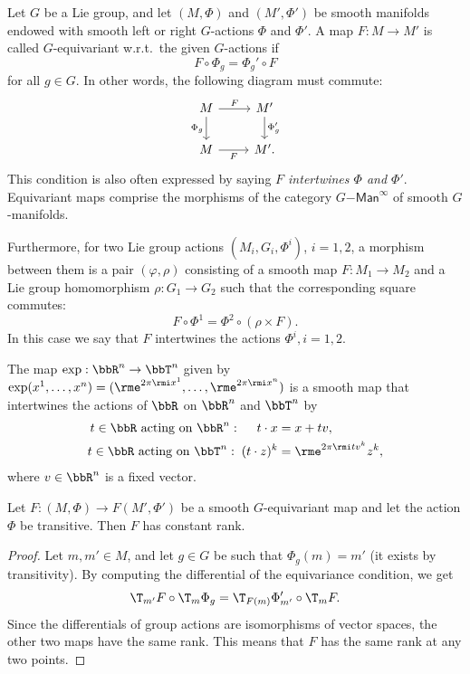 \begin{defn}
    Let $G$ be a Lie group, and let $(M,\Phi)$ and $(M',\Phi')$ be smooth manifolds endowed with smooth left or right $G$-actions $\Phi$ and $\Phi'$. A map $F:M\to M'$ is called $G$-equivariant w.r.t.\ the given $G$-actions if
    \[F\circ \Phi_g=\Phi_g' \circ F\]
    for all $g\in G$.
    In other words, the following diagram must commute:
    \[
    \begin{tikzcd}[every matrix/.append style={name=m}]
       M \arrow[r,"F"]\arrow[d,"\Phi_g",swap] & M'\arrow[d,"\Phi_g'"]\\
       M \arrow[r,"F", swap] & M'.
    \end{tikzcd}
    \]
    This condition is also often expressed by saying \emph{$F$ intertwines $\Phi$ and $\Phi'$}. Equivariant maps comprise the morphisms of the category $G\mathsf{-Man}^\infty$ of smooth $G$-manifolds.

    Furthermore, for two Lie group actions $(M_i,G_i,\Phi^i)$, $i=1,2$, a morphism between them is a pair $(\varphi,\rho)$ consisting of a smooth map $F:M_1\to M_2$ and a Lie group homomorphism $\rho:G_1\to G_2$ such that the corresponding square commutes:
    \[F\circ \Phi^1=\Phi^2\circ \left(\rho\times F \right).\]
    In this case we say that $F$ intertwines the actions $\Phi^i,i=1,2$.
\end{defn}

\begin{example}
    The map $\exp:\bbR^n\to \bbT^n$ given by $\exp(x^1,\ldots,x^n)=(\rme^{2\pi\rmi x^1},\ldots,\rme^{2\pi\rmi x^n})$ is a smooth map that intertwines the actions of $\bbR$ on $\bbR^n$ and $\bbT^n$ by
    \begin{align}
        t\in\bbR\text{ acting on }\bbR^n:\;\quad t\cdot x&=x+tv,\\
        t\in\bbR\text{ acting on }\bbT^n:\; (t\cdot z)^k&=\rme^{2\pi\rmi tv^k}z^k,
    \end{align}
    where $v\in\bbR^n$ is a fixed vector.
\end{example}

\begin{thm}\label{thm equivariant rank}
    Let $F:(M,\Phi)\to F(M',\Phi')$ be a smooth $G$-equivariant map and let the action $\Phi$ be transitive. Then $F$ has constant rank.
\end{thm}
\begin{proof}
    Let $m,m'\in M$, and let $g\in G$ be such that $\Phi_g(m)=m'$ (it exists by transitivity). By computing the differential of the equivariance condition, we get
    \[\T_{m'}F\circ \T_m\Phi_g=\T_{F(m)}\Phi_{m'}'\circ \T_mF.\]
    Since the differentials of group actions are isomorphisms of vector spaces, the other two maps have the same rank. This means that $F$ has the same rank at any two points.
\end{proof}


